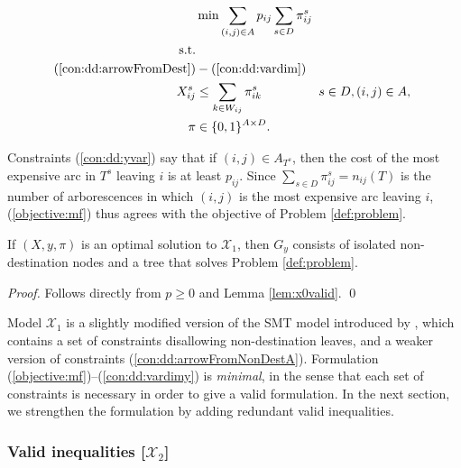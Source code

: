 \begin{subequations}[resume]\label{eq:smt-x2}
\begin{align}
\label{objective:mf} \makebox[0pt][l]{$\displaystyle{} \min \sum\limits_{(i,j) \in A} p_{ij} \sum\limits_{s \in D} \pi^s_{ij} $}\\
\notag\text{s.t.}\\
\notag(\ref{con:dd:arrowFromDest}) &- (\ref{con:dd:vardim})\\
\label{con:dd:yvar} X^s_{ij} & \leq \sum_{k\in W_{ij}}\pi^s_{ik} & s\in D, (i,j)\in A,\\
\label{con:dd:vardimy} \pi & \in \{0,1\}^{A\times D}.
\end{align}~
\end{subequations}

Constraints (\ref{con:dd:yvar}) say that if $(i,j)\in A_{T^s}$, then the cost of the most expensive arc in $T^s$ leaving $i$ is at least $p_{ij}$.
Since $\sum_{s\in D}\pi_{ij}^s=n_{ij}(T)$ is the number of arborescences in which $(i,j)$ is the most expensive arc leaving $i$,
(\ref{objective:mf}) thus agrees with the objective of Problem \ref{def:problem}.

\begin{prop}
\label{prop:x1valid}
If $(X,y,\pi)$ is an optimal solution to $\mathcal{X}_1$, then $G_y$ consists of isolated non-destination nodes and a tree that
solves Problem \ref{def:problem}.
\end{prop}
\begin{proof}
Follows directly from $p\geq 0$ and Lemma \ref{lem:x0valid}.
\qed
\end{proof}

Model $\mathcal{X}_1$ is a slightly modified version of the SMT model introduced by \citet{ivanova16isco},
which contains a set of constraints disallowing non-destination leaves, and a weaker version of constraints (\ref{con:dd:arrowFromNonDestA}).
Formulation (\ref{objective:mf})--(\ref{con:dd:vardimy}) is \emph{minimal},
in the sense that each set of constraints is necessary in order to give a valid formulation.
In the next section, we strengthen the formulation by adding redundant valid inequalities.

\subsubsection{Valid inequalities [$\mathcal{X}_2$]} \label{sec:x2}


